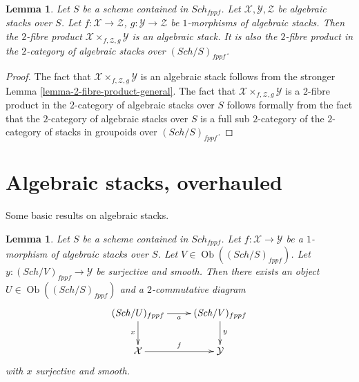 \documentclass{stacks-project}
\theoremstyle{plain}
\newtheorem{lemma}[subsection]{Lemma}
\theoremstyle{definition}
\theoremstyle{remark}
\numberwithin{equation}{subsection}
\def\Sch{\mathit{Sch}}
\def\Ob{\mathop{\mathrm{Ob}}\nolimits}
\begin{document}
\begin{lemma}
\label{lemma-2-fibre-product}
Let $S$ be a scheme contained in $\Sch_{fppf}$.
Let $\mathcal{X}, \mathcal{Y}, \mathcal{Z}$ be algebraic stacks over $S$.
Let $f : \mathcal{X} \to \mathcal{Z}$, $g : \mathcal{Y} \to \mathcal{Z}$
be $1$-morphisms of algebraic stacks. Then the $2$-fibre product
$\mathcal{X} \times_{f, \mathcal{Z}, g} \mathcal{Y}$ is an algebraic stack.
It is also the $2$-fibre product in the $2$-category of algebraic stacks
over $(\Sch/S)_{fppf}$.
\end{lemma}

\begin{proof}
The fact that $\mathcal{X} \times_{f, \mathcal{Z}, g} \mathcal{Y}$ is an
algebraic stack follows from the stronger
Lemma \ref{lemma-2-fibre-product-general}.
The fact that $\mathcal{X} \times_{f, \mathcal{Z}, g} \mathcal{Y}$
is a $2$-fibre product in the $2$-category of algebraic stacks over $S$
follows formally from the fact that the $2$-category of algebraic stacks
over $S$ is a full sub $2$-category of the $2$-category of stacks in
groupoids over $(\Sch/S)_{fppf}$.
\end{proof}







\section{Algebraic stacks, overhauled}
\label{section-overhaul}

\noindent
Some basic results on algebraic stacks.

\begin{lemma}
\label{lemma-lift-morphism-presentations}
Let $S$ be a scheme contained in $\Sch_{fppf}$.
Let $f : \mathcal{X} \to \mathcal{Y}$ be a $1$-morphism of algebraic
stacks over $S$.
Let $V \in \Ob((\Sch/S)_{fppf})$.
Let $y : (\Sch/V)_{fppf} \to \mathcal{Y}$ be surjective and smooth.
Then there exists an object $U \in \Ob((\Sch/S)_{fppf})$
and a $2$-commutative diagram
$$
\xymatrix{
(\Sch/U)_{fppf} \ar[r]_a \ar[d]_x &
(\Sch/V)_{fppf} \ar[d]^y \\
\mathcal{X} \ar[r]^f & \mathcal{Y}
}
$$
with $x$ surjective and smooth.
\end{lemma}
\end{document}
